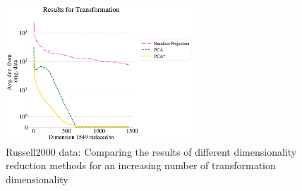 \documentclass[pdftex,12pt,a4paper]{report}
\begin{document}
\begin{figure}[htb!]
    \includegraphics[width=7cm]{./images/real-world/russell2000_stock/avg_dev_vs_dyn_low/transformed_1lines_504points_multiple_scalar_product.pdf}
    \caption{Russell2000 data: Comparing the results of different dimensionality reduction methods for an increasing number of transformation dimensionality} \label{fig:avg_dev_vs_low_dim-russell}
\end{figure}
\end{document}
